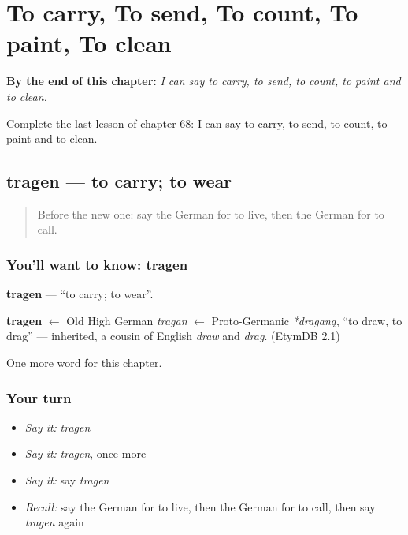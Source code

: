 
\chapter{To carry, To send, To count, To paint, To clean}
\label{ch:ge-to-carry-to-send-to-count-to-paint-to-clean}

\begin{chapteropening}
\textbf{By the end of this chapter:} \emph{I can say to carry, to send, to count, to paint and to clean.}

Complete the last lesson of chapter 68: I can say to carry, to send, to count, to paint and to clean.
\end{chapteropening}

\section[tragen]{tragen — to carry; to wear}

\label{lesson:GE-C68-tragen}



\begin{quote}
Before the new one: say the German for to live, then the German for to call.
\end{quote}

\subsection*{You'll want to know: tragen}
\textbf{tragen} — \textquotedblleft{}to carry; to wear\textquotedblright{}.

\begin{cousinweb}
\textbf{tragen} $\leftarrow$ Old High German \emph{tragan} $\leftarrow$ Proto-Germanic \emph{*draganą}, \textquotedblleft{}to draw, to drag\textquotedblright{} — inherited, a cousin of English \emph{draw} and \emph{drag}. (EtymDB 2.1)
\end{cousinweb}

\begin{grammarlens}[title={What you've built}]
One more word for this chapter.
\end{grammarlens}

\subsection*{Your turn}
\begin{itemize}
\raggedright
  \item \emph{Say it:} \emph{tragen}
  \item \emph{Say it:} \emph{tragen}, once more
  \item \emph{Say it:} say \emph{tragen}
  \item \emph{Recall:} say the German for to live, then the German for to call, then say \emph{tragen} again
\end{itemize}

